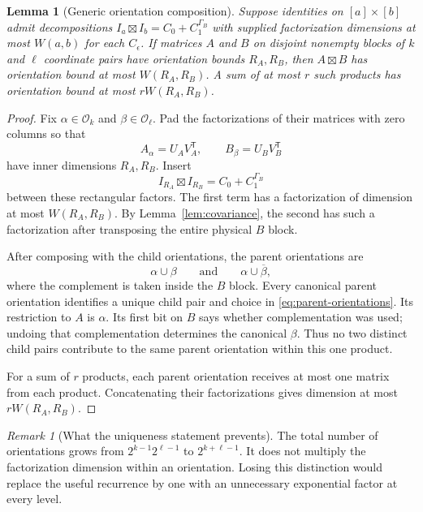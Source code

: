 \documentclass[11pt]{article}
\newtheorem{lemma}[theorem]{Lemma}
\theoremstyle{definition}
\theoremstyle{remark}
\newtheorem{remark}[theorem]{Remark}
\newcommand{\Ori}{\mathcal O}
\newcommand{\trsp}{\mathsf T}
\begin{document}
\begin{lemma}[Generic orientation composition]
\label{lem:composition}
Suppose identities on $[a]\times[b]$ admit decompositions
$I_a\boxtimes I_b=C_0+C_1^{\Gamma_B}$ with supplied factorization
dimensions at most $W(a,b)$ for each $C_\epsilon$.
If matrices $A$ and $B$ on disjoint nonempty blocks of $k$ and
$\ell$ coordinate pairs have orientation bounds $R_A,R_B$, then
$A\boxtimes B$ has orientation bound at most $W(R_A,R_B)$.
A sum of at most $r$ such products has orientation bound at most
$rW(R_A,R_B)$.
\end{lemma}

\begin{proof}
Fix $\alpha\in\Ori_k$ and $\beta\in\Ori_\ell$. Pad the
factorizations of their matrices with zero columns so that
\[
 A_\alpha=U_AV_A^{\trsp},\qquad
 B_\beta=U_BV_B^{\trsp}
\]
have inner dimensions $R_A,R_B$. Insert
\[
 I_{R_A}\boxtimes I_{R_B}=C_0+C_1^{\Gamma_B}
\]
between these rectangular factors. The first term has a
factorization of dimension at most $W(R_A,R_B)$. By
Lemma~\ref{lem:covariance}, the second has such a factorization
after transposing the entire physical $B$ block.

After composing with the child orientations, the parent
orientations are
\begin{equation}
\label{eq:parent-orientations}
 \alpha\cup\beta
 \qquad\text{and}\qquad
 \alpha\cup\overline\beta,
\end{equation}
where the complement is taken inside the $B$ block. Every
canonical parent orientation identifies a unique child pair and
choice in \eqref{eq:parent-orientations}. Its restriction to $A$
is $\alpha$. Its first bit on $B$ says whether complementation
was used; undoing that complementation determines the canonical
$\beta$. Thus no two distinct child pairs contribute to the same
parent orientation within this one product.

For a sum of $r$ products, each parent orientation receives at
most one matrix from each product. Concatenating their
factorizations gives dimension at most $rW(R_A,R_B)$.
\end{proof}

\begin{remark}[What the uniqueness statement prevents]
The total number of orientations grows from
$2^{k-1}2^{\ell-1}$ to $2^{k+\ell-1}$. It does not multiply the
factorization dimension within an orientation. Losing this
distinction would replace the useful recurrence by one with an
unnecessary exponential factor at every level.
\end{remark}
\end{document}
